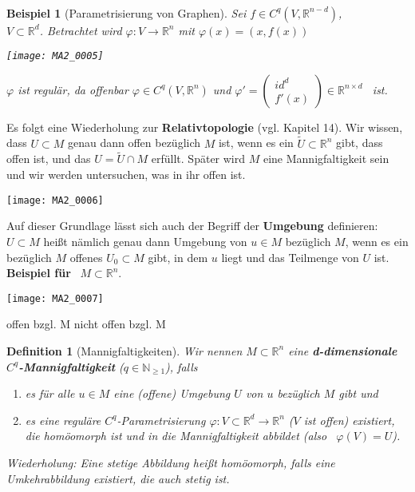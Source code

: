 \documentclass[a4paper,12pt,portrait]{book}
\theoremstyle{theoremstyle}
\newtheorem*{definition}{Definition}
\newtheorem{beispiel}[theo]{Beispiel}
\begin{document}
\ \linebreak
\begin{beispiel}[Parametrisierung von Graphen]
Sei $f\in C^q(V,\mathbb{R}^{n-d})$,\\
$V\subset\mathbb{R}^d$. Betrachtet wird $\varphi:V\rightarrow\mathbb{R}^n$ mit $\varphi(x)=(x,f(x))$\\
\begin{center}
\texttt{[image: MA2\_0005]}\\
\end{center}
$\varphi$ ist regulär, da offenbar $\varphi\in C^q(V,\mathbb{R}^n)$ und $\varphi'=\begin{pmatrix}
id^d \\ f'(x)
\end{pmatrix}\in\mathbb{R}^{n\times d}$ \ ist.\\
\linebreak
\end{beispiel}
Es folgt eine Wiederholung zur \textbf{Relativtopologie} (vgl. Kapitel 14). Wir wissen, dass $U\subset M$ genau dann offen bezüglich $M$ ist, wenn es ein $\tilde{U}\subset\mathbb{R}^n$ gibt, dass offen ist, und das $U=\tilde{U}\cap M$ erfüllt. Später wird $M$ eine Mannigfaltigkeit sein und wir werden untersuchen, was in ihr offen ist.\\
\begin{center}
\texttt{[image: MA2\_0006]}\\
\end{center}
Auf dieser Grundlage lässt sich auch der Begriff der \textbf{Umgebung} definieren:\\
$U\subset M$ heißt nämlich genau dann Umgebung von $u\in M$ bezüglich $M$, wenn es ein bezüglich $M$ offenes $U_0\subset M$ gibt, in dem $u$ liegt und das Teilmenge von $U$ ist.\linebreak\linebreak
\newpage
\textbf{\textsf{Beispiel für}} \ $M\subset\mathbb{R}^n$.\\
\begin{center}
\texttt{[image: MA2\_0007]}\\
\end{center}
\hspace{70pt} offen bzgl. M \hspace{70pt} nicht offen bzgl. M\\
\begin{definition}[Mannigfaltigkeiten]
Wir nennen $M\subset\mathbb{R}^n$ eine \textbf{d-dimensionale $C^q$-Mannigfaltigkeit} ($q\in\mathbb{N}_{\geq 1}$), falls
\begin{enumerate}
\item es für alle $u\in M$ eine (offene) Umgebung $U$ von $u$ bezüglich $M$ gibt und
\item es eine reguläre $C^q$-Parametrisierung $\varphi:V\subset\mathbb{R}^d\rightarrow\mathbb{R}^n$ ($V$ ist offen) existiert, die homöomorph ist und in die Mannigfaltigkeit abbildet (also \  $\varphi(V)=U$).
\end{enumerate}
\emph{Wiederholung: Eine stetige Abbildung heißt homöomorph, falls eine Umkehrabbildung existiert, die auch stetig ist.}\\
\end{definition}
\end{document}

